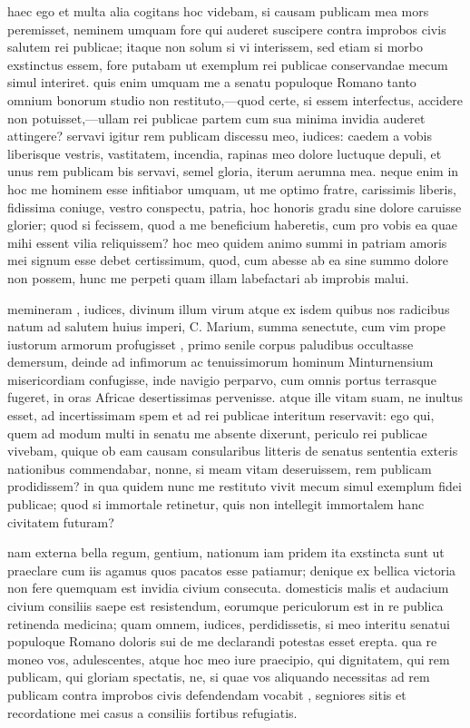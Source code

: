  haec ego et multa alia cogitans hoc videbam, si causam publicam mea mors peremisset, neminem umquam fore qui auderet suscipere contra improbos civis salutem rei publicae; itaque non solum si vi interissem, sed etiam si morbo exstinctus essem, fore putabam ut exemplum rei publicae conservandae mecum simul interiret. quis enim umquam me a senatu populoque Romano tanto omnium bonorum studio non restituto,—quod certe, si essem interfectus, accidere non potuisset,—ullam rei publicae partem cum sua minima invidia auderet attingere? servavi igitur rem publicam discessu meo, iudices: caedem a vobis liberisque vestris, vastitatem, incendia, rapinas meo dolore luctuque depuli, et unus rem publicam bis servavi, semel gloria, iterum aerumna mea. neque enim in hoc me hominem esse infitiabor umquam, ut me optimo fratre, carissimis liberis, fidissima coniuge, vestro conspectu, patria, hoc honoris gradu sine dolore caruisse glorier; quod si fecissem, quod a me beneficium haberetis, cum pro vobis ea quae mihi essent vilia reliquissem? hoc meo quidem animo summi in patriam amoris mei signum esse debet certissimum, quod, cum abesse ab ea sine summo dolore non possem, hunc me perpeti quam illam labefactari ab improbis malui.

 memineram , iudices, divinum illum virum atque ex isdem quibus nos radicibus natum ad salutem huius imperi, C. Marium, summa senectute, cum vim prope iustorum armorum profugisset , primo senile corpus paludibus occultasse demersum, deinde ad infimorum ac tenuissimorum hominum Minturnensium misericordiam confugisse, inde navigio perparvo, cum omnis portus terrasque fugeret, in oras Africae desertissimas pervenisse. atque ille vitam suam, ne inultus esset, ad incertissimam spem et ad rei publicae interitum reservavit: ego qui, quem ad modum multi in senatu me absente dixerunt, periculo rei publicae vivebam, quique ob eam causam consularibus litteris de senatus sententia exteris nationibus commendabar, nonne, si meam vitam deseruissem, rem publicam prodidissem? in qua quidem nunc me restituto vivit mecum simul exemplum fidei publicae; quod si immortale retinetur, quis non intellegit immortalem hanc civitatem futuram?

 nam externa bella regum, gentium, nationum iam pridem ita exstincta sunt ut praeclare cum iis agamus quos pacatos esse patiamur; denique ex bellica victoria non fere quemquam est invidia civium consecuta. domesticis malis et audacium civium consiliis saepe est resistendum, eorumque periculorum est in re publica retinenda medicina; quam omnem, iudices, perdidissetis, si meo interitu senatui populoque Romano doloris sui de me declarandi potestas esset erepta. qua re moneo vos, adulescentes, atque hoc meo iure praecipio, qui dignitatem, qui rem publicam, qui gloriam spectatis, ne, si quae vos aliquando necessitas ad rem publicam contra improbos civis defendendam vocabit , segniores sitis et recordatione mei casus a consiliis fortibus refugiatis.

